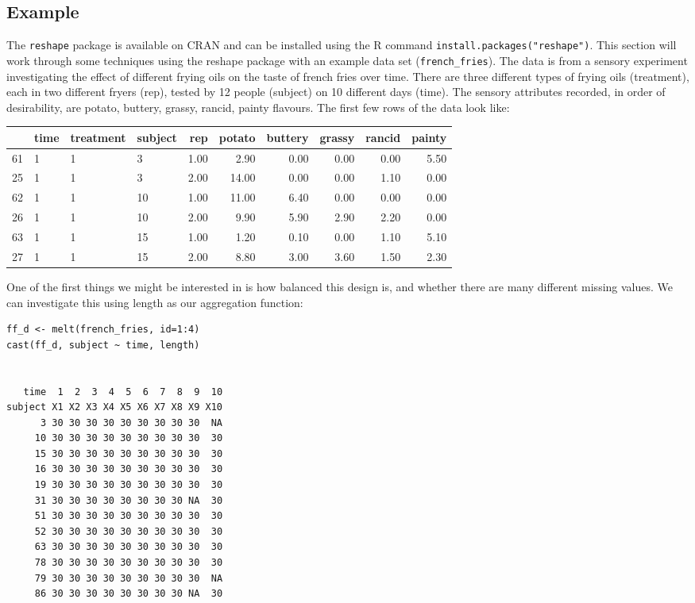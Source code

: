 \documentclass[]{article}
\begin{document}
\subsection{Example}


The \texttt{reshape} package is available on CRAN and can be installed using the R command \texttt{install.packages("reshape")}.  This section will work through some techniques using the reshape package with an example data set (\texttt{french\_fries}).  The data is from a sensory experiment investigating the effect of different frying oils on the taste of french fries over time.  There are three different types of frying oils (treatment), each in two different fryers (rep), tested by 12 people (subject) on 10 different days (time).  The sensory attributes recorded, in order of desirability, are potato, buttery, grassy, rancid, painty flavours.  The first few rows of the data look like:

\begin{table}[ht]
\begin{center}
\begin{tabular}{rlllrrrrrr}
\hline
 & time & treatment & subject & rep & potato & buttery & grassy & rancid & painty \\
\hline
61 & 1 & 1 & 3 & 1.00 & 2.90 & 0.00 & 0.00 & 0.00 & 5.50 \\
25 & 1 & 1 & 3 & 2.00 & 14.00 & 0.00 & 0.00 & 1.10 & 0.00 \\
62 & 1 & 1 & 10 & 1.00 & 11.00 & 6.40 & 0.00 & 0.00 & 0.00 \\
26 & 1 & 1 & 10 & 2.00 & 9.90 & 5.90 & 2.90 & 2.20 & 0.00 \\
63 & 1 & 1 & 15 & 1.00 & 1.20 & 0.10 & 0.00 & 1.10 & 5.10 \\
27 & 1 & 1 & 15 & 2.00 & 8.80 & 3.00 & 3.60 & 1.50 & 2.30 \\
\hline
\end{tabular}
\end{center}
\end{table}


One of the first things we might be interested in is how balanced this design is, and whether there are many different missing values.  We can investigate this using length as our aggregation function:

\begin{verbatim}
ff_d <- melt(french_fries, id=1:4)
cast(ff_d, subject ~ time, length)

                                      
   time  1  2  3  4  5  6  7  8  9  10
subject X1 X2 X3 X4 X5 X6 X7 X8 X9 X10
      3 30 30 30 30 30 30 30 30 30  NA
     10 30 30 30 30 30 30 30 30 30  30
     15 30 30 30 30 30 30 30 30 30  30
     16 30 30 30 30 30 30 30 30 30  30
     19 30 30 30 30 30 30 30 30 30  30
     31 30 30 30 30 30 30 30 30 NA  30
     51 30 30 30 30 30 30 30 30 30  30
     52 30 30 30 30 30 30 30 30 30  30
     63 30 30 30 30 30 30 30 30 30  30
     78 30 30 30 30 30 30 30 30 30  30
     79 30 30 30 30 30 30 30 30 30  NA
     86 30 30 30 30 30 30 30 30 NA  30
\end{verbatim}
\end{document}

